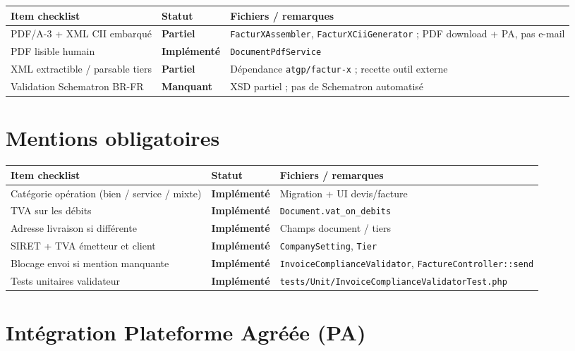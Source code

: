 \documentclass[11pt,a4paper]{report}
\newcommand{\route}[1]{\texttt{\small #1}}
\newcommand{\ctrl}[1]{\texttt{\small #1}}
\newcommand{\svc}[1]{\texttt{\small #1}}
\newcommand{\model}[1]{\texttt{\small #1}}
\newcommand{\statimpl}{\textcolor{statok}{\textbf{Implémenté}}}
\newcommand{\statpart}{\textcolor{statpartial}{\textbf{Partiel}}}
\newcommand{\statmiss}{\textcolor{statno}{\textbf{Manquant}}}
\begin{document}
\begin{longtable}{@{}L{7.8cm}C{2.4cm}L{4.4cm}@{}}
    \toprule
    \textbf{Item checklist} & \textbf{Statut} & \textbf{Fichiers / remarques} \\
    \midrule
    \endhead
    PDF/A-3 + XML CII embarqué & \statpart & \svc{FacturXAssembler}, \svc{FacturXCiiGenerator} ; PDF download + PA, pas e-mail \\
    PDF lisible humain & \statimpl & \svc{DocumentPdfService} \\
    XML extractible / parsable tiers & \statpart & Dépendance \texttt{atgp/factur-x} ; recette outil externe \\
    Validation Schematron BR-FR & \statmiss & XSD partiel ; pas de Schematron automatisé \\
    \bottomrule
\end{longtable}

\section{Mentions obligatoires}

\begin{longtable}{@{}L{7.8cm}C{2.4cm}L{4.4cm}@{}}
    \toprule
    \textbf{Item checklist} & \textbf{Statut} & \textbf{Fichiers / remarques} \\
    \midrule
    \endhead
    Catégorie opération (bien / service / mixte) & \statimpl & Migration + UI devis/facture \\
    TVA sur les débits & \statimpl & \model{Document.vat\_on\_debits} \\
    Adresse livraison si différente & \statimpl & Champs document / tiers \\
    SIRET + TVA émetteur et client & \statimpl & \model{CompanySetting}, \model{Tier} \\
    Blocage envoi si mention manquante & \statimpl & \svc{InvoiceComplianceValidator}, \ctrl{FactureController::send} \\
    Tests unitaires validateur & \statimpl & \route{tests/Unit/InvoiceComplianceValidatorTest.php} \\
    \bottomrule
\end{longtable}

\section{Intégration Plateforme Agréée (PA)}
\end{document}
